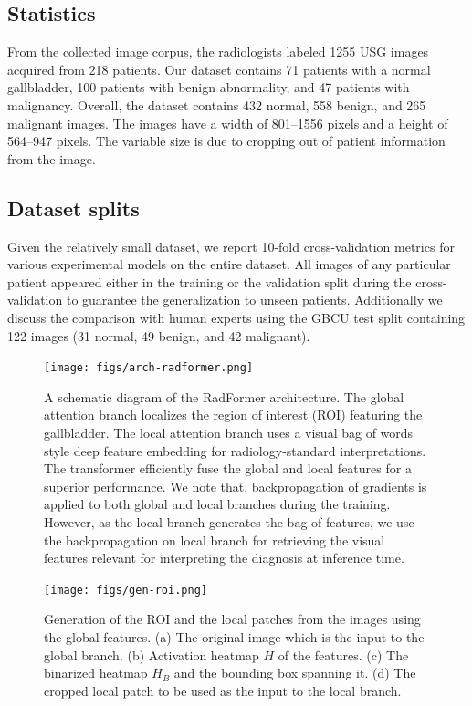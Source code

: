 \documentclass[twocolumn,final]{elsarticle}
\def\myarch{RadFormer\xspace}
\begin{document}
\subsection{Statistics}
%
From the collected image corpus, the radiologists labeled 1255 USG images acquired from 218 patients. Our dataset contains 71 patients with a normal gallbladder, 100 patients with benign abnormality, and 47 patients with malignancy. Overall, the dataset contains 432 normal, 558 benign, and 265 malignant images. The images have a width of 801--1556 pixels and a height of 564--947 pixels. The variable size is due to cropping out of patient information from the image.

\subsection{Dataset splits}
%
Given the relatively small dataset, we report 10-fold cross-validation metrics for various experimental models on the entire dataset. All images of any particular patient appeared either in the training or the validation split during the cross-validation to guarantee the generalization to unseen patients. Additionally we discuss the comparison with human experts using the GBCU test split containing 122 images (31 normal, 49 benign, and 42 malignant).

\begin{figure}[t]
    \centering
    \texttt{[image: figs/arch-radformer.png]}
    \caption{A schematic diagram of the \myarch architecture. The global attention branch localizes the region of interest (ROI) featuring the gallbladder. The local attention branch uses a visual bag of words style deep feature embedding for radiology-standard interpretations. The transformer efficiently fuse the global and local features for a superior performance. We note that, backpropagation of gradients is applied to both global and local branches during the training. However, as the local branch generates the bag-of-features, we use the backpropagation on local branch for retrieving the visual features relevant for interpreting the diagnosis at inference time. }
    \label{fig:arch}
\end{figure}
%


\begin{figure}[t]
    \centering
    \texttt{[image: figs/gen-roi.png]}
    \caption{Generation of the ROI and the local patches from the images using the global features. (a) The original image which is the input to the global branch. (b) Activation heatmap $H$ of the features. (c) The binarized heatmap $H_B$ and the bounding box spanning it. (d) The cropped local patch to be used as the input to the local branch.}
    \label{fig:roi_mask}
\end{figure}
\end{document}
